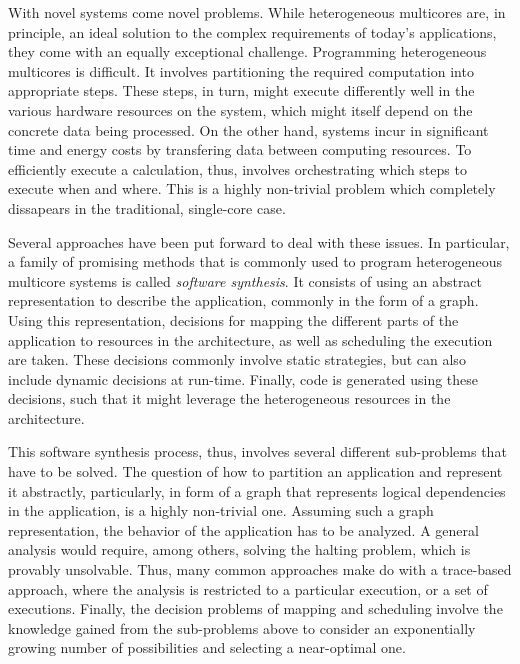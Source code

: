 \documentclass[sigplan,10pt]{acmart}
\begin{document}
With novel systems come novel problems. While heterogeneous multicores are, in principle, an ideal solution to the complex requirements of today's applications, they come with an equally exceptional challenge.
Programming heterogeneous multicores is difficult. It involves partitioning the required computation into appropriate steps. These steps, in turn, might execute differently well in the various hardware resources on the system,
which might itself depend on the concrete data being processed.
On the other hand, systems incur in significant time and energy costs by transfering data between computing resources.
To efficiently execute a calculation, thus, involves orchestrating which steps to execute when and where.
This is a highly non-trivial problem which completely dissapears in the traditional, single-core case.

Several approaches have been put forward to deal with these issues.
In particular, a family of promising methods that is commonly used to program heterogeneous multicore systems is called \emph{software synthesis}\cite{bhattacharyya2012software,sgroi1999synthesis}.
It consists of using an abstract representation to describe the application, commonly in the form of a graph.
Using this representation, decisions for mapping the different parts of the application to resources in the architecture, as well as scheduling the execution are taken.
These decisions commonly involve static strategies, but can also include dynamic decisions at run-time.
Finally, code is generated using these decisions, such that it might leverage the heterogeneous resources in the architecture.

This software synthesis process, thus, involves several different sub-problems that have to be solved.
The question of how to partition an application and represent it abstractly, particularly, in form of a graph that represents logical dependencies in the application, is a highly non-trivial one.
Assuming such a graph representation, the behavior of the application has to be analyzed.
A general analysis would require, among others, solving the halting problem, which is provably unsolvable.
Thus, many common approaches make do with a trace-based approach, where the analysis is restricted to a particular execution, or a set of executions.
Finally, the decision problems of mapping and scheduling involve the knowledge gained from the sub-problems above to consider an exponentially growing number of possibilities and selecting a near-optimal one.
\end{document}
